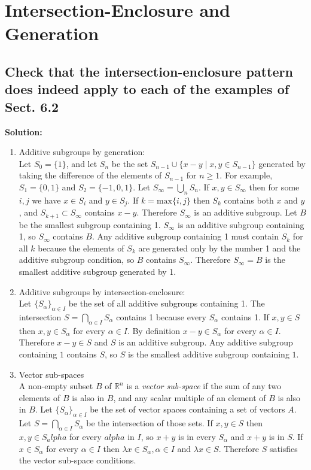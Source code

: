 \documentclass{article}
\newcommand{\exercise}[1]{\subsection{\normalfont #1}}
\newcommand{\solution}{\indent\indent \textbf{Solution: }}
\begin{document}
\newpage
\section{Intersection-Enclosure and Generation}
\exercise{Check that the intersection-enclosure pattern does indeed apply to each of the examples of Sect. 6.2}
\solution
\begin{enumerate}
\item Additive subgroups by generation: \\
Let $S_0 = \{1\}$, and let $S_n$ be the set $S_{n-1} \cup \{x-y\mid x,y \in S_{n-1}\}$ generated by taking the difference of the elements of $S_{n-1}$ for $n \geq 1$. For example, $S_1 = \{0, 1\}$ and $S_2 = \{-1, 0, 1\}$. Let $S_\infty = \bigcup_n S_n$. If $x, y \in S_\infty$ then for some $i, j$ we have $x\in S_i$ and $y\in S_j$. If $k = \text{max}\{i, j\}$ then $S_k$ contains both $x$ and $y$, and $S_{k+1} \subset S_\infty$ contains $x-y$. Therefore $S_\infty$ is an additive subgroup. Let $B$ be the smallest subgroup containing 1. $S_\infty$ is an additive subgroup containing 1, so $S_\infty$ contains $B$. Any additive subgroup containing 1 must contain $S_k$ for all $k$ because the elements of $S_k$ are generated only by the number 1 and the additive subgroup condition, so $B$ contains $S_\infty$. Therefore $S_\infty=B$ is the smallest additive subgroup generated by 1.
\item[] Additive subgroups by intersection-enclosure: \\
Let $\{S_\alpha\}_{\alpha \in I}$ be the set of all additive subgroups containing 1. The intersection $S=\bigcap_{\alpha\in I} S_\alpha$ contains 1 because every $S_\alpha$ contains 1. If $x, y \in S$ then $x,y \in S_\alpha$ for every $\alpha \in I$. By definition $x-y \in S_\alpha$ for every $\alpha \in I$. Therefore $x-y \in S$ and $S$ is an additive subgroup. Any additive subgroup containing $1$ contains $S$, so $S$ is the smallest additive subgroup containing $1$. 

\item Vector sub-spaces \\
A non-empty subset $B$ of $\mathbb{R}^n$ is a \textit{vector sub-space} if the sum of any two elements of $B$ is also in $B$, and any scalar multiple of an element of $B$ is also in $B$. Let $\{S_\alpha\}_{\alpha \in I}$ be the set of vector spaces containing a set of vectors $A$. Let $S=\bigcap_{\alpha \in I} S_\alpha$ be the intersection of those sets. If $x, y \in S$ then $x,y\in S_alpha$ for every $alpha$ in $I$, so $x+y$ is in every $S_\alpha$ and $x+y$ is in $S$. If $x \in S_\alpha$ for every $\alpha \in I$ then $\lambda x \in S_\alpha, \alpha \in I$ and $\lambda x \in S$. Therefore $S$ satisfies the vector sub-space conditions. 


\end{enumerate}
\end{document}
